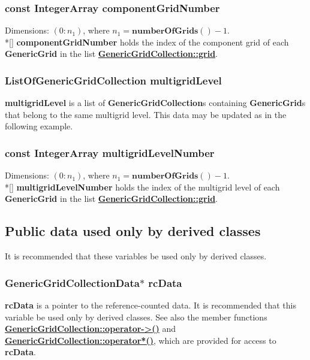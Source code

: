 \documentclass{article}
\begin{document}
  \subsubsection{const IntegerArray componentGridNumber}
  \label{GenericGridCollection::componentGridNumber}
    Dimensions: $(0\colon n_1)$, where $n_1 = \textbf{numberOfGrids}() - 1$. \\*[\parskip]
    \textbf{componentGridNumber} holds the index of the component grid of each \textbf{GenericGrid} in the list
    {\bf{}\hyperref{grid}{grid \rm(\S}{)}{GenericGridCollection::grid}}.

  \subsubsection{ListOfGenericGridCollection multigridLevel}
  \label{GenericGridCollection::multigridLevel}
    \textbf{multigridLevel} is a list of \textbf{GenericGridCollection}s containing \textbf{GenericGrid}s that belong to the same multigrid level.
    This data may be updated as in the following example.

  \subsubsection{const IntegerArray multigridLevelNumber}
  \label{GenericGridCollection::multigridLevelNumber}
    Dimensions: $(0\colon n_1)$, where $n_1 = \textbf{numberOfGrids}() - 1$. \\*[\parskip]
    \textbf{multigridLevelNumber} holds the index of the multigrid level of each \textbf{GenericGrid} in the list
    {\bf{}\hyperref{grid}{grid \rm(\S}{)}{GenericGridCollection::grid}}.

\subsection{Public data used only by derived classes}
\label{GenericGridCollection::PublicDerivedClassData}

It is recommended that these variables be used only by derived classes.

  \subsubsection{GenericGridCollectionData$*$ rcData}
  \label{GenericGridCollection::rcData}
    \textbf{rcData} is a pointer to the reference-counted data.
    It is recommended that this variable be used only by derived classes.
    See also the member functions
    {\bf{}\hyperref{operator${-}{>}$()}{operator${-}{>}$() \rm(\S}{)}{GenericGridCollection::operator->()}}
    and {\bf{}\hyperref{operator$*$()}{operator$*$() \rm(\S}{)}{GenericGridCollection::operator*()}},
    which are provided for access to \textbf{rcData}.
\end{document}

